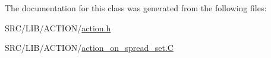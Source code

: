 The documentation for this class was generated from the following files\+:\begin{DoxyCompactItemize}
\item 
S\+R\+C/\+L\+I\+B/\+A\+C\+T\+I\+O\+N/\mbox{\hyperlink{action_8h}{action.\+h}}\item 
S\+R\+C/\+L\+I\+B/\+A\+C\+T\+I\+O\+N/\mbox{\hyperlink{action__on__spread__set_8_c}{action\+\_\+on\+\_\+spread\+\_\+set.\+C}}\end{DoxyCompactItemize}
